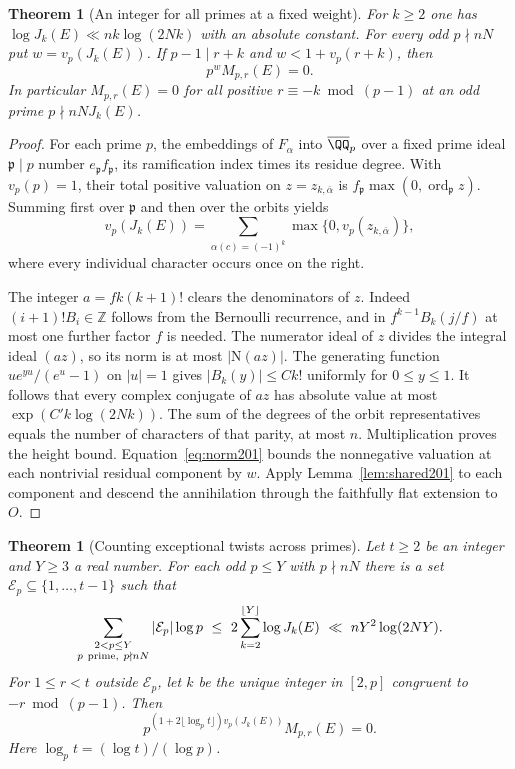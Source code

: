 \documentclass[a4paper,11pt]{article}
\newtheorem{theorem}[proposition]{Theorem}
\theoremstyle{definition}
\theoremstyle{remark}
\newcommand{\ZZ}{\mathbb Z}\newcommand{\ord}{\operatorname{ord}}
\numberwithin{equation}{section}
\begin{document}
\begin{theorem}[An integer for all primes at a fixed weight]
\label{thm:integer201}
For \(k\ge2\) one has \(\log J_k(E)\ll nk\log(2Nk)\) with an
absolute constant. For every odd \(p\nmid nN\) put \(w=v_p(J_k(E))\).
If \(p-1\mid r+k\) and \(w<1+v_p(r+k)\), then
\[
                         p^w M_{p,r}(E)=0.
\]
In particular \(M_{p,r}(E)=0\) for all positive \(r\equiv-k\bmod(p-1)\)
at an odd prime \(p\nmid nN J_k(E)\).
\end{theorem}

\begin{proof}
For each prime \(p\), the embeddings of \(F_\alpha\) into
\(\overline{\QQ}_p\) over a fixed prime ideal \(\mathfrak p\mid p\)
number \(e_\mathfrak p f_\mathfrak p\), its ramification index
times its residue degree. With \(v_p(p)=1\), their total positive
valuation on \(z=z_{k,\bar\alpha}\) is
\(f_\mathfrak p\max(0,\ord_\mathfrak p z)\). Summing first over
\(\mathfrak p\) and then over the orbits yields
\begin{equation}
 v_p(J_k(E))=\sum_{\alpha(c)=(-1)^k}
                     \max\{0,v_p(z_{k,\bar\alpha})\},
 \label{eq:norm201}
\end{equation}
where every individual character occurs once on the right.

The integer \(a=f k(k+1)!\) clears the denominators of \(z\).
Indeed \((i+1)!B_i\in\ZZ\) follows from the Bernoulli recurrence,
and in \(f^{k-1}B_k(j/f)\) at most one further factor \(f\)
is needed. The numerator ideal of \(z\) divides the integral
ideal \((az)\), so its norm is at most \(|\mathrm N(az)|\).
The generating function \(u e^{yu}/(e^u-1)\) on \(|u|=1\)
gives \(|B_k(y)|\le Ck!\) uniformly for \(0\le y\le1\).
It follows that every complex conjugate of \(az\) has absolute
value at most \(\exp(C'k\log(2Nk))\). The sum of the degrees of
the orbit representatives equals the number of characters of
that parity, at most \(n\). Multiplication proves the height bound.
Equation~\eqref{eq:norm201} bounds the nonnegative valuation at
each nontrivial residual component by \(w\). Apply
Lemma~\ref{lem:shared201} to each component and descend the
annihilation through the faithfully flat extension to \(O\).
\end{proof}

\begin{theorem}[Counting exceptional twists across primes]
\label{thm:shared201}
Let \(t\ge2\) be an integer and \(Y\ge3\) a real number. For
each odd \(p\le Y\) with \(p\nmid nN\) there is a set
\(\mathcal E_p\subseteq\{1,\ldots,t-1\}\) such that
\begin{equation}
 \sum_{\substack{2<p\le Y\\p\ {\rm prime},\ p\nmid nN}}
       |\mathcal E_p|\log p
 \ \le\ 2\sum_{k=2}^{\lfloor Y\rfloor}\log J_k(E)
 \ \ll\ nY^2\log(2NY).
 \label{eq:count201}
\end{equation}
For \(1\le r<t\) outside \(\mathcal E_p\), let \(k\) be the unique integer in
\([2,p]\) congruent to \(-r\bmod(p-1)\). Then
\[
 p^{(1+2\lfloor\log_p t\rfloor)v_p(J_k(E))}M_{p,r}(E)=0.
\]
Here \(\log_p t=(\log t)/(\log p)\).
\end{theorem}
\end{document}
